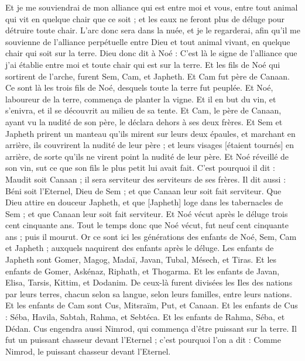 \begin{multicols}{2}
Et je me souviendrai de mon alliance qui est entre moi et vous, entre tout animal qui vit en quelque chair que ce soit ; et les eaux ne feront plus de déluge pour détruire toute chair.
L'arc donc sera dans la nuée, et je le regarderai, afin qu'il me souvienne de l'alliance perpétuelle entre Dieu et tout animal vivant, en quelque chair qui soit sur la terre.
Dieu donc dit à Noé : C'est là le signe de l'alliance que j'ai établie entre moi et toute chair qui est sur la terre.
Et les fils de Noé qui sortirent de l'arche, furent Sem, Cam, et Japheth. Et Cam fut père de Canaan.
Ce sont là les trois fils de Noé, desquels toute la terre fut peuplée.
Et Noé, laboureur de la terre, commença de planter la vigne.
Et il en but du vin, et s'enivra, et il se découvrit au milieu de sa tente.
Et Cam, le père de Canaan, ayant vu la nudité de son père, le déclara dehors à ses deux frères.
Et Sem et Japheth prirent un manteau qu'ils mirent sur leurs deux épaules, et marchant en arrière, ils couvrirent la nudité de leur père ; et leurs visages [étaient tournés] en arrière, de sorte qu'ils ne virent point la nudité de leur père.
Et Noé réveillé de son vin, sut ce que son fils le plus petit lui avait fait.
C'est pourquoi il dit : Maudit soit Canaan ; il sera serviteur des serviteurs de ses frères.
Il dit aussi : Béni soit l'Eternel, Dieu de Sem ; et que Canaan leur soit fait serviteur.
Que Dieu attire en douceur Japheth, et que [Japheth] loge dans les tabernacles de Sem ; et que Canaan leur soit fait serviteur.
Et Noé vécut après le déluge trois cent cinquante ans.
Tout le temps donc que Noé vécut, fut neuf cent cinquante ans ; puis il mourut.
\VerseOne{}Or ce sont ici les générations des enfants de Noé, Sem, Cam et Japheth ; auxquels naquirent des enfants après le déluge.
Les enfants de Japheth sont Gomer, Magog, Madaï, Javan, Tubal, Mésech, et Tiras.
Et les enfants de Gomer, Askénaz, Riphath, et Thogarma.
Et les enfants de Javan, Elisa, Tarsis, Kittim, et Dodanim.
De ceux-là furent divisées les Iles des nations par leurs terres, chacun selon sa langue, selon leurs familles, entre leurs nations.
Et les enfants de Cam sont Cus, Mitsraïm, Put, et Canaan.
Et les enfants de Cus : Séba, Havila, Sabtah, Rahma, et Sebtéca. Et les enfants de Rahma, Séba, et Dédan.
Cus engendra aussi Nimrod, qui commença d'être puissant sur la terre.
Il fut un puissant chasseur devant l'Eternel ; c'est pourquoi l'on a dit : Comme Nimrod, le puissant chasseur devant l'Eternel.

\end{multicols}
